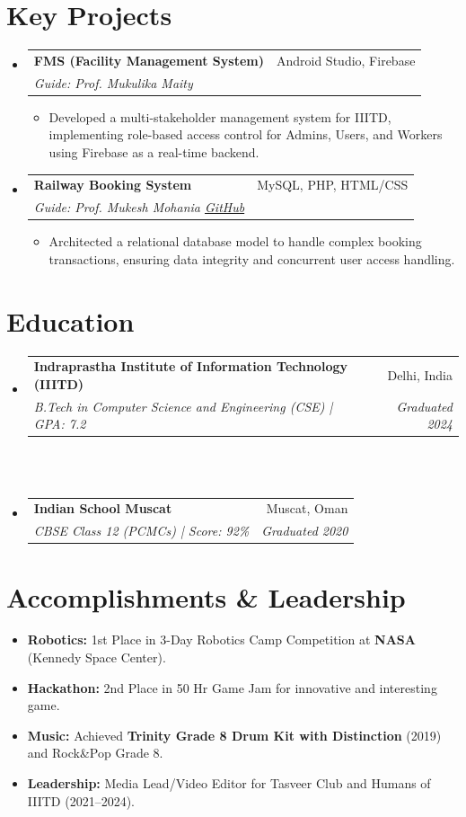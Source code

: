 \documentclass[10pt, a4paper]{article}
\makeatletter
\newcommand{\resumeItem}[1]{\item\small{#1 \vspace{-2pt}}}
\newcommand{\resumeSubheading}[4]{
  \vspace{-1pt}\item
    \begin{tabular*}{0.97\textwidth}[t]{l@{\extracolsep{\fill}}r}
      \textbf{#1} & #2 \\
      \textit{\small#3} & \textit{\small #4} \\
    \end{tabular*}\vspace{-5pt}
}
\makeatother
\begin{document}
\section*{Key Projects}
\begin{itemize}[leftmargin=0.15in, label={}]

  \resumeSubheading
    {FMS (Facility Management System)}{Android Studio, Firebase}
    {Guide: Prof. Mukulika Maity}{}
    \begin{itemize}[leftmargin=0.15in, label=\textbullet]
        \resumeItem{Developed a multi-stakeholder management system for IIITD, implementing role-based access control for Admins, Users, and Workers using Firebase as a real-time backend.}
    \end{itemize}

  \resumeSubheading
    {Railway Booking System}{MySQL, PHP, HTML/CSS}
    {Guide: Prof. Mukesh Mohania \quad \href{https://github.com/ChaitanyaJainYT/RailwayBooking}{GitHub}}{}
    \begin{itemize}[leftmargin=0.15in, label=\textbullet]
        \resumeItem{Architected a relational database model to handle complex booking transactions, ensuring data integrity and concurrent user access handling.}
    \end{itemize}

\end{itemize}

\section*{Education}
\begin{itemize}[leftmargin=0.15in, label={}]
  \resumeSubheading
    {Indraprastha Institute of Information Technology (IIITD)}{Delhi, India}
    {B.Tech in Computer Science and Engineering (CSE) | GPA: 7.2}{Graduated 2024} \\\
  \resumeSubheading
    {Indian School Muscat}{Muscat, Oman}
    {CBSE Class 12 (PCMCs) | Score: 92\%}{Graduated 2020}
\end{itemize}

\section*{Accomplishments \& Leadership}
\begin{itemize}[leftmargin=0.15in, label=\textbullet]
    \resumeItem{\textbf{Robotics:} 1st Place in 3-Day Robotics Camp Competition at \textbf{NASA} (Kennedy Space Center).}
    \resumeItem{\textbf{Hackathon:} 2nd Place in 50 Hr Game Jam for innovative and interesting game.}
    \resumeItem{\textbf{Music:} Achieved \textbf{Trinity Grade 8 Drum Kit with Distinction} (2019) and Rock\&Pop Grade 8.}
    \resumeItem{\textbf{Leadership:} Media Lead/Video Editor for Tasveer Club and Humans of IIITD (2021--2024).}
\end{itemize}
\end{document}
